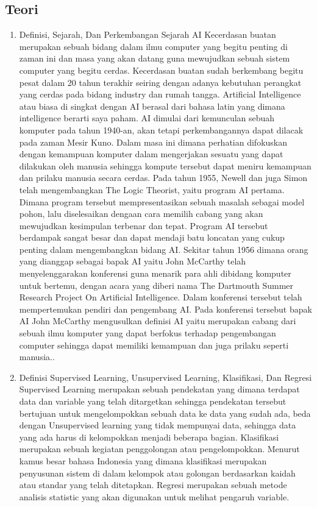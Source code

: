 \subsection{Teori}
\begin{enumerate}
\item
Definisi, Sejarah, Dan Perkembangan Sejarah AI
\subitem
Kecerdasan buatan merupakan sebuah bidang dalam ilmu computer yang begitu penting di zaman ini dan masa yang akan datang guna mewujudkan sebuah sistem computer yang begitu cerdas. Kecerdasan buatan sudah berkembang begitu pesat dalam 20 tahun terakhir seiring dengan adanya kebutuhan perangkat yang cerdas pada bidang industry dan rumah tangga.
\subitem
Artificial Intelligence atau biasa di singkat dengan AI berasal dari bahasa latin yang dimana intelligence berarti saya paham. AI dimulai dari kemunculan sebuah komputer pada tahun 1940-an, akan tetapi perkembangannya dapat dilacak pada zaman Mesir Kuno. Dalam masa ini dimana perhatian difokuskan dengan kemampuan komputer dalam mengerjakan sesuatu yang dapat dilakukan oleh manusia sehingga kompute tersebut dapat meniru kemampuan dan prilaku manusia secara cerdas.
\subitem
Pada tahun 1955, Newell dan juga Simon telah mengembangkan The Logic Theorist, yaitu program AI pertama. Dimana program tersebut mempresentasikan sebuah masalah sebagai model pohon, lalu diselesaikan dengaan cara memilih cabang yang akan mewujudkan kesimpulan terbenar dan tepat. Program AI tersebut berdampak sangat besar dan dapat mendaji batu loncatan yang cukup penting dalam mengembangkan bidang AI. Sekitar tahun 1956 dimana orang yang dianggap sebagai bapak AI yaitu John McCarthy telah menyelenggarakan konferensi guna menarik para ahli dibidang komputer untuk bertemu, dengan acara yang diberi nama The Dartmouth Summer Research Project On Artificial Intelligence. Dalam konferensi tersebut telah mempertemukan pendiri dan pengembang AI. Pada konferensi tersebut bapak AI John McCarthy mengusulkan definisi AI yaitu merupakan cabang dari sebuah ilmu komputer yang dapat berfokus terhadap pengembangan computer sehingga dapat memiliki kemampuan dan juga prilaku seperti manusia.\cite{baraja2008kecerdasan}.

\item
Definisi Supervised Learning, Unsupervised Learning, Klasifikasi, Dan Regresi
\subitem
Supervised Learning merupakan sebuah pendekatan yang dimana terdapat data dan variable yang telah ditargetkan sehingga pendekatan tersebut bertujuan untuk mengelompokkan sebuah data ke data yang sudah ada, beda dengan Unsupervised learning yang tidak mempunyai data, sehingga data yang ada harus di kelompokkan menjadi beberapa bagian.
\subitem
Klasifikasi merupakan sebuah kegiatan penggolongan atau pengelompokkan. Menurut kamus besar bahasa Indonesia yang dimana klasifikasi merupakan penyusunan sistem di dalam kelompok atau golongan berdasarkan kaidah atau standar yang telah ditetapkan. Regresi merupakan sebuah metode analisis statistic yang akan digunakan untuk melihat pengaruh variable.


\end{enumerate}

